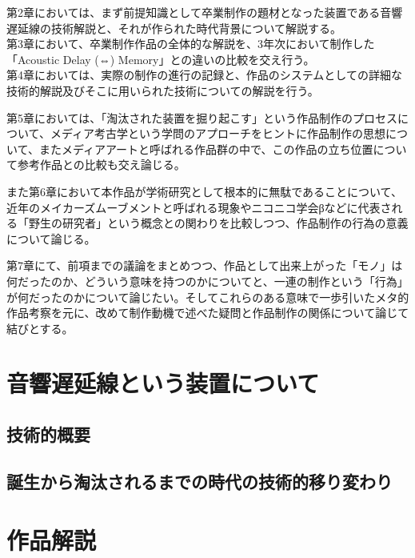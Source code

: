 第2章においては、まず前提知識として卒業制作の題材となった装置である音響遅延線の技術解説と、それが作られた時代背景について解説する。\\
第3章において、卒業制作作品の全体的な解説を、3年次において制作した「Acoustic
Delay (⇔) Memory」との違いの比較を交え行う。\\
第4章においては、実際の制作の進行の記録と、作品のシステムとしての詳細な技術的解説及びそこに用いられた技術についての解説を行う。

第5章においては、「淘汰された装置を掘り起こす」という作品制作のプロセスについて、メディア考古学という学問のアプローチをヒントに作品制作の思想について、またメディアアートと呼ばれる作品群の中で、この作品の立ち位置について参考作品との比較も交え論じる。

また第6章において本作品が学術研究として根本的に無駄であることについて、近年のメイカーズムーブメントと呼ばれる現象やニコニコ学会βなどに代表される「野生の研究者」という概念との関わりを比較しつつ、作品制作の行為の意義について論じる。

第7章にて、前項までの議論をまとめつつ、作品として出来上がった「モノ」は何だったのか、どういう意味を持つのかについてと、一連の制作という「行為」が何だったのかについて論じたい。そしてこれらのある意味で一歩引いたメタ的作品考察を元に、改めて制作動機で述べた疑問と作品制作の関係について論じて結びとする。

\chapter{音響遅延線という装置について}\label{ux97f3ux97ffux9045ux5ef6ux7ddaux3068ux3044ux3046ux88c5ux7f6eux306bux3064ux3044ux3066}

\section{技術的概要}\label{ux6280ux8853ux7684ux6982ux8981}

\section{誕生から淘汰されるまでの時代の技術的移り変わり}\label{ux8a95ux751fux304bux3089ux6dd8ux6c70ux3055ux308cux308bux307eux3067ux306eux6642ux4ee3ux306eux6280ux8853ux7684ux79fbux308aux5909ux308fux308a}

\chapter{作品解説}\label{ux4f5cux54c1ux89e3ux8aac}

